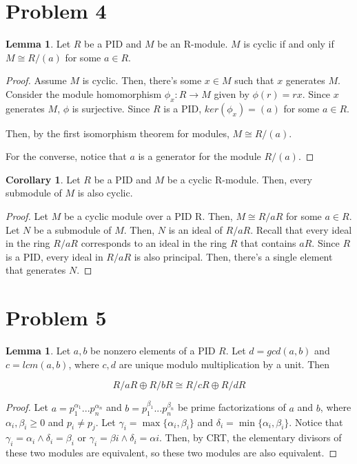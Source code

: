 \documentclass{article}
\theoremstyle{definition}
\newtheorem{lemma}[theorem]{Lemma}
\newtheorem{corollary}{Corollary}[theorem]
\begin{document}
\section{Problem 4}

\begin{lemma}
    Let $R$ be a PID and $M$ be an R-module. $M$ is cyclic if and only if $M \cong R/(a)$ for some $a \in R$.
\end{lemma}
\begin{proof}
    Assume $M$ is cyclic. Then, there's some $x \in M$ such that $x$ generates $M$. Consider the module homomorphism $\phi_{x}: R \xrightarrow{} M$ given by $\phi(r) = rx$. Since $x$ generates $M$, $\phi$ is surjective. Since $R$ is a PID, $ker(\phi_{x}) = (a)$ for some $a \in R$.
    
    Then, by the first isomorphism theorem for modules, $M \cong R/(a)$. 

    For the converse, notice that $a$ is a generator for the module $R/(a)$.
\end{proof}

\begin{corollary}
    Let $R$ be a PID and $M$ be a cyclic R-module. Then, every submodule of $M$ is also cyclic.
\end{corollary}
\begin{proof}
    Let $M$ be a cyclic module over a PID R. Then, $M \cong R/aR$ for some $a \in R$. Let $N$ be a submodule of $M$. Then, $N$ is an ideal of $R/aR$. Recall that every ideal in the ring $R/aR$ corresponds to an ideal in the ring $R$ that contains $aR$. Since $R$ is a PID, every ideal in $R/aR$ is also principal. Then, there's a single element that generates $N$.
\end{proof}

\section{Problem 5}

\begin{lemma}
    Let $a,b$ be nonzero elements of a PID $R$. Let $d = gcd(a,b)$ and $c = lcm(a,b)$, where $c,d$ are unique modulo multiplication by a unit. Then

    \[ R/aR \oplus R/bR \cong R/cR \oplus R/dR\]
\end{lemma}
\begin{proof}
    Let $a = p_{1}^{\alpha_{1}}...p_{n}^{\alpha_{n}}$ and $b = p_{1}^{\beta_{1}}...p_{n}^{\beta_{n}}$ be prime factorizations of $a$ and $b$, where $\alpha_{i}, \beta_{i} \geq 0$ and $p_{i} \neq p_{j}$. Let $\gamma_{i} = \max{\{\alpha_{i},\beta_{i}\}}$ and $\delta_{i} = \min{\{\alpha_{i},\beta_{i}\}}$. Notice that $\gamma_{i} = \alpha_{i} \land \delta_{i} = \beta_{i}$ or $\gamma_{i} = \beta{i} \land \delta_{i} = \alpha{i}$. Then, by CRT, the elementary divisors of these two modules are equivalent, so these two modules are also equivalent.
\end{proof}
\end{document}
